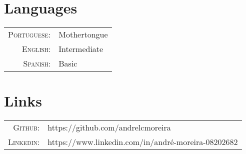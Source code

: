 \documentclass[a4paper,10pt]{article}
\begin{document}
\section{Languages}
\begin{tabular}{rl}
  \textsc{Portuguese:}& Mothertongue\\
  \textsc{English:}& Intermediate\\
  \textsc{Spanish:}& Basic\\
\end{tabular}

\section{Links}
\begin{tabular}{rl}
  \textsc{Github:}& https://github.com/andrelcmoreira\\
  \textsc{Linkedin:}&https://www.linkedin.com/in/andré-moreira-08202682 \\
\end{tabular}
\end{document}
